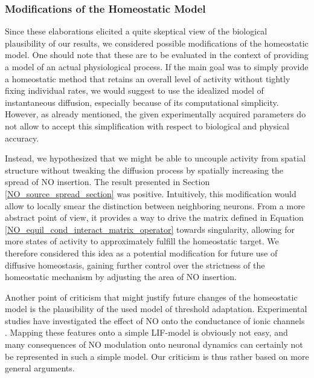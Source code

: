 \documentclass[10pt,a4paper]{article}
\begin{document}
\subsubsection{Modifications of the Homeostatic Model}\label{Possible_Modifications_Section}
Since these elaborations elicited a quite skeptical view of the biological plausibility of our results, we considered possible modifications of the homeostatic model. One should note that these are to be evaluated in the context of providing a model of an actual physiological process. If the main goal was to simply provide a homeostatic method that retains an overall level of activity without tightly fixing individual rates, we would suggest to use the idealized model of instantaneous diffusion, especially because of its computational simplicity. However, as already mentioned, the given experimentally acquired parameters do not allow to accept this simplification with respect to biological and physical accuracy.

Instead, we hypothesized that we might be able to uncouple activity from spatial structure without tweaking the diffusion process by spatially increasing the spread of NO insertion. The result presented in Section \ref{NO_source_spread_section} was positive. Intuitively, this modification would allow to locally smear the distinction between neighboring neurons. From a more abstract point of view, it provides a way to drive the matrix defined in Equation \eqref{NO_equil_cond_interact_matrix_operator} towards singularity, allowing for more states of activity to approximately fulfill the homeostatic target. We therefore considered this idea as a potential modification for future use of diffusive homeostasis, gaining further control over the strictness of the homeostatic mechanism by adjusting the area of NO insertion.

Another point of criticism that might justify future changes of the homeostatic model is the plausibility of the used model of threshold adaptation. Experimental studies have investigated the effect of NO onto the conductance of ionic channels \cite{Steinert_NO,Steinert_NO_2011}. Mapping these features onto a simple LIF-model is obviously not easy, and many consequences of NO modulation onto neuronal dynamics can certainly not be represented in such a simple model. Our criticism is thus rather based on more general arguments.
\end{document}
